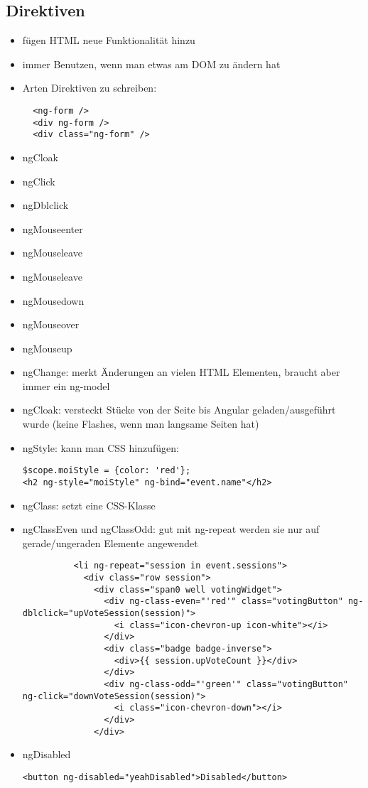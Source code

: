\subsection{Direktiven}
\begin{itemize}
  \item fügen HTML neue Funktionalität hinzu
  \item immer Benutzen, wenn man etwas am DOM zu ändern hat
  \item Arten Direktiven zu schreiben:
    \begin{verbatim}
  <ng-form />
  <div ng-form />
  <div class="ng-form" />
    \end{verbatim}
  \item ngCloak
\end{itemize}


\begin{itemize}
  \item ngClick
  \item ngDblclick
  \item ngMouseenter
  \item ngMouseleave
  \item ngMouseleave
  \item ngMousedown
  \item ngMouseover
  \item ngMouseup
  \item ngChange: merkt Änderungen an vielen HTML Elementen, braucht aber immer ein ng-model
  \item ngCloak: versteckt Stücke von der Seite bis Angular geladen/ausgeführt wurde (keine Flashes,
    wenn man langsame Seiten hat)
  \item ngStyle: kann man CSS hinzufügen:
    \begin{verbatim}
$scope.moiStyle = {color: 'red'};
<h2 ng-style="moiStyle" ng-bind="event.name"</h2>
    \end{verbatim}
  \item ngClass: setzt eine CSS-Klasse
  \item ngClassEven und ngClassOdd: gut mit ng-repeat werden sie nur auf gerade/ungeraden Elemente angewendet
    \begin{verbatim}
          <li ng-repeat="session in event.sessions">
            <div class="row session">
              <div class="span0 well votingWidget">
                <div ng-class-even="'red'" class="votingButton" ng-dblclick="upVoteSession(session)">
                  <i class="icon-chevron-up icon-white"></i>
                </div>
                <div class="badge badge-inverse">
                  <div>{{ session.upVoteCount }}</div>
                </div>
                <div ng-class-odd="'green'" class="votingButton" ng-click="downVoteSession(session)">
                  <i class="icon-chevron-down"></i>
                </div>
              </div>
    \end{verbatim}
  \item ngDisabled
    \begin{verbatim}
<button ng-disabled="yeahDisabled">Disabled</button>


\end{verbatim}
\end{itemize}
